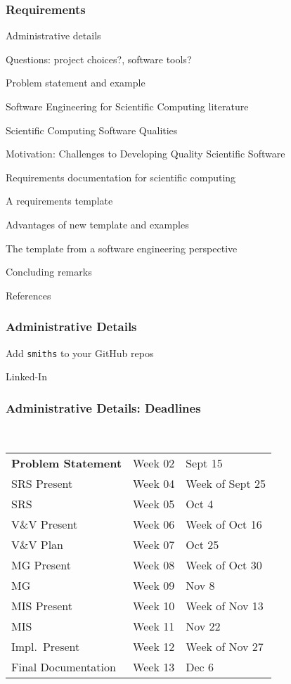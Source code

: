 \documentclass[t,12pt,numbers,fleqn]{beamer}
\begin{document}



\begin{frame}
\frametitle{Requirements}

\bi
\item Administrative details
\item Questions: project choices?, software tools?
\item Problem statement and example
\item Software Engineering for Scientific Computing literature
\item Scientific Computing Software Qualities
\item Motivation: Challenges to Developing Quality Scientific Software
\item Requirements documentation for scientific computing
\item A requirements template
\item Advantages of new template and examples
\item The template from a software engineering perspective
\item Concluding remarks
\item References
\ei
\end{frame}


\begin{frame}
\frametitle{Administrative Details}

\bi
\item Add \texttt{smiths} to your GitHub repos
\item Linked-In
\item {}
\ei

\end{frame}


\begin{frame}
\frametitle{Administrative Details: Deadlines}
~\newline
\begin{tabular}{l l l}
\textbf{Problem Statement} & Week 02 & Sept 15\\
SRS Present & Week 04 & Week of Sept 25\\
SRS & Week 05 & Oct 4\\
V\&V Present & Week 06 & Week of Oct 16\\
V\&V Plan & Week 07 & Oct 25\\
MG Present & Week 08 & Week of Oct 30\\
MG & Week 09 & Nov 8\\
MIS Present & Week 10 & Week of Nov 13\\
MIS & Week 11 & Nov 22\\
Impl.\ Present & Week 12 & Week of Nov 27\\
Final Documentation & Week 13 & Dec 6\\
\end {tabular}

\end{frame}
\end{document}
